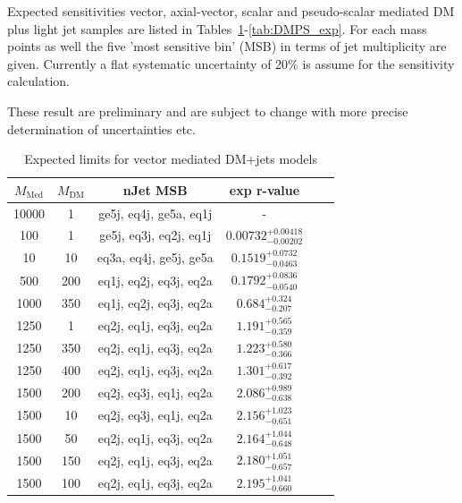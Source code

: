 \clearpage


Expected sensitivities vector, axial-vector, scalar and pseudo-scalar mediated DM plus light jet samples are listed in Tables~\ref{tab:DMV_exp}-\ref{tab:DMPS_exp}. For each mass points as well the five 'most sensitive bin' (MSB) in terms of jet multiplicity are given. Currently a flat systematic uncertainty of 20\% is assume for the sensitivity calculation.

These result are preliminary and are subject to change with more precise determination of uncertainties etc.
\begin{table}
  \centering
  \begin{tabular}{cccccc}
    \hline\hline
    $M_{\text{Med}}$ & $M_{\text{DM}}$ & nJet MSB & exp r-value \\
    \hline
    10000 & 1 & ge5j, eq4j, ge5a, eq1j & - \\
    100 & 1 & ge5j, eq3j, eq2j, eq1j & $0.00732_{-0.00202}^{+0.00418}$ \\
    10 & 10 & eq3a, eq4j, ge5j, ge5a & $0.1519_{-0.0463}^{+0.0732}$ \\
    500 & 200 & eq1j, eq2j, eq3j, eq2a & $0.1792_{-0.0540}^{+0.0836}$ \\
    1000 & 350 & eq1j, eq2j, eq3j, eq2a & $0.684_{-0.207}^{+0.324}$ \\
    1250 & 1 & eq2j, eq1j, eq3j, eq2a & $1.191_{-0.359}^{+0.565}$ \\
    1250 & 350 & eq2j, eq1j, eq3j, eq2a & $1.223_{-0.366}^{+0.580}$ \\
    1250 & 400 & eq2j, eq1j, eq3j, eq2a & $1.301_{-0.392}^{+0.617}$ \\
    1500 & 200 & eq2j, eq3j, eq1j, eq2a & $2.086_{-0.638}^{+0.989}$ \\
    1500 & 10 & eq2j, eq3j, eq1j, eq2a & $2.156_{-0.651}^{+1.023}$ \\
    1500 & 50 & eq2j, eq1j, eq3j, eq2a & $2.164_{-0.648}^{+1.044}$ \\
    1500 & 150 & eq2j, eq1j, eq3j, eq2a & $2.180_{-0.657}^{+1.051}$ \\
    1500 & 100 & eq2j, eq1j, eq3j, eq2a & $2.195_{-0.660}^{+1.041}$ \\
    \hline\hline
  \end{tabular}
  \caption{Expected limits for vector mediated DM+jets models}
  \label{tab:DMV_exp}
\end{table}


